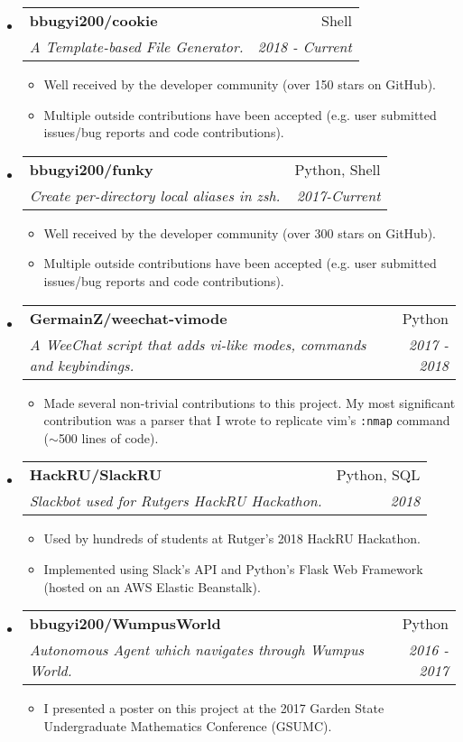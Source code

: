 \documentclass[letterpaper,11pt]{article}
\makeatletter
\newcommand{\ressubheading}[4]{
\begin{tabular*}{6.5in}{l@{\cftdotfill{\cftsecdotsep}\extracolsep{\fill}}r}
		\textbf{#1} & #2 \\
		\textit{#3} & \textit{#4} \\
\end{tabular*}\vspace{-6pt}}
\makeatother
\begin{document}
\begin{itemize}
\item \ressubheading{bbugyi200/cookie}{Shell}{A Template-based File Generator.}{2018 - Current}
    \begin{itemize}
        \item
            Well received by the developer community (over 150 stars on GitHub).
        \item
            Multiple outside contributions have been accepted (e.g. user submitted issues/bug reports and code contributions).
    \end{itemize}
\item \ressubheading{bbugyi200/funky}{Python, Shell}{Create per-directory local aliases in zsh.}{2017-Current}
    \begin{itemize}
        \item
            Well received by the developer community (over 300 stars on GitHub).
        \item
            Multiple outside contributions have been accepted (e.g. user submitted issues/bug reports and code contributions).
    \end{itemize}
\item \ressubheading{GermainZ/weechat-vimode}{Python}{A WeeChat script that adds vi-like modes, commands and keybindings.}{2017 - 2018}
    \begin{itemize}
        \item
            Made several non-trivial contributions to this project. My most significant contribution was a parser that I wrote to replicate vim's \texttt{:nmap} command ($\sim$500 lines of code).
    \end{itemize}
\item \ressubheading{HackRU/SlackRU}{Python, SQL}{Slackbot used for Rutgers HackRU Hackathon.}{2018}
    \begin{itemize}
        \item
            Used by hundreds of students at Rutger's 2018 HackRU Hackathon.
        \item
            Implemented using Slack's API and Python's Flask Web Framework (hosted on an AWS Elastic Beanstalk).
    \end{itemize}
\item \ressubheading{bbugyi200/WumpusWorld}{Python}{Autonomous Agent which navigates through Wumpus World.}{2016 - 2017}
    \begin{itemize}
        \item
            I presented a poster on this project at the 2017 Garden State Undergraduate Mathematics Conference (GSUMC).
    \end{itemize}
\end{itemize}
\end{document}
